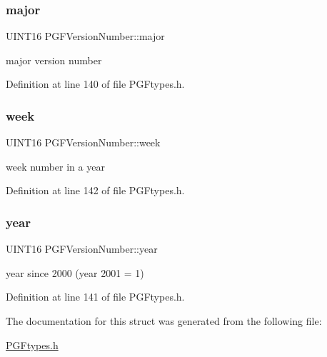 \subsubsection{\texorpdfstring{major}{major}}
{\footnotesize\ttfamily U\+I\+N\+T16 P\+G\+F\+Version\+Number\+::major}



major version number 



Definition at line 140 of file P\+G\+Ftypes.\+h.

\mbox{\label{structPGFVersionNumber_a4391fcda3b38f0514dff17ea5c0ea81e}} 
\subsubsection{\texorpdfstring{week}{week}}
{\footnotesize\ttfamily U\+I\+N\+T16 P\+G\+F\+Version\+Number\+::week}



week number in a year 



Definition at line 142 of file P\+G\+Ftypes.\+h.

\mbox{\label{structPGFVersionNumber_ab4eaf66cd93fcf46b5dcc06dbe44837f}} 
\subsubsection{\texorpdfstring{year}{year}}
{\footnotesize\ttfamily U\+I\+N\+T16 P\+G\+F\+Version\+Number\+::year}



year since 2000 (year 2001 = 1) 



Definition at line 141 of file P\+G\+Ftypes.\+h.



The documentation for this struct was generated from the following file\+:\begin{DoxyCompactItemize}
\item 
\mbox{\hyperlink{PGFtypes_8h}{P\+G\+Ftypes.\+h}}\end{DoxyCompactItemize}
